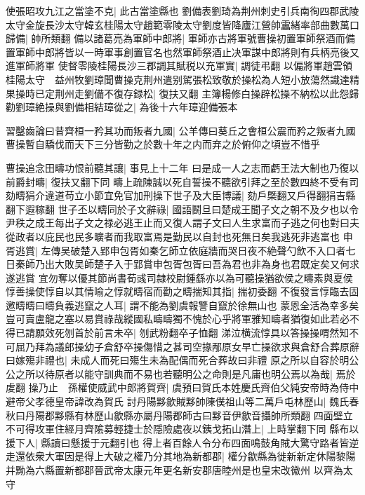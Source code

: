 使張昭攻九江之當塗不克|{
	此古當塗縣也}
劉備表劉琦為荆州刺史引兵南徇四郡武陵太守金旋長沙太守韓玄桂陽太守趙範零陵太守劉度皆降廬江營帥靁緒率部曲數萬口歸備|{
	帥所類翻}
備以諸葛亮為軍師中郎將|{
	軍師亦古將軍號曹操初置軍師祭酒而備置軍師中郎將皆以一時軍事創置官名也然軍師祭酒止决軍謀中郎將則有兵柄亮後又進軍師將軍}
使督零陵桂陽長沙三郡調其賦税以充軍實|{
	調徒弔翻}
以偏將軍趙雲領桂陽太守　益州牧劉璋聞曹操克荆州遣别駕張松致敬於操松為人短小放蕩然識達精果操時已定荆州走劉備不復存録松|{
	復扶又翻}
主簿楊修白操辟松操不納松以此怨歸勸劉璋絶操與劉備相結璋從之|{
	為後十六年璋迎備張本}


習鑿齒論曰昔齊桓一矜其功而叛者九國|{
	公羊傳曰葵丘之會桓公震而矜之叛者九國}
曹操暫自驕伐而天下三分皆勤之於數十年之内而弃之於俯仰之頃豈不惜乎

曹操追念田疇功恨前聽其讓|{
	事見上十二年}
曰是成一人之志而虧王法大制也乃復以前爵封疇|{
	復扶又翻下同}
疇上疏陳誠以死自誓操不聽欲引拜之至於數四終不受有司劾疇狷介違道苟立小節宜免官加刑操下世子及大臣博議|{
	劾戶槩翻又戶得翻狷吉縣翻下遐稼翻}
世子丕以疇同於子文辭祿|{
	國語鬭旦曰楚成王聞子文之朝不及夕也以令尹秩之成王每出子文之禄必逃王止而又復人謂子文曰人生求富而子逃之何也對曰夫從政者以庇民也民多曠者而我取富焉是勤民以自封也死無日矣我逃死非逃富也}
申胥逃賞|{
	左傳吴破楚入郢申包胥如秦乞師立依庭牆而哭日夜不絶聲勺飲不入口者七日秦師乃出大敗吴師楚子入于郢賞申包胥包胥曰吾為君也非為身也君既定矣又何求遂逃賞}
宜勿奪以優其節尚書荀彧司隸校尉鍾繇亦以為可聽操猶欲侯之疇素與夏侯惇善操使惇自以其情喻之惇就疇宿而勸之疇揣知其指|{
	揣初委翻}
不復發言惇臨去固邀疇疇曰疇負義逃竄之人耳|{
	謂不能為劉虞報讐自竄於徐無山也}
蒙恩全活為幸多矣豈可賣盧龍之塞以易賞祿哉縱國私疇疇獨不愧於心乎將軍雅知疇者猶復如此若必不得已請願效死刎首於前言未卒|{
	刎武粉翻卒子恤翻}
涕泣横流惇具以答操操喟然知不可屈乃拜為議郎操幼子倉舒卒操傷惜之甚司空掾邴原女早亡操欲求與倉舒合葬原辭曰嫁殤非禮也|{
	未成人而死曰殤生未為配偶而死合葬故曰非禮}
原之所以自容於明公公之所以待原者以能守訓典而不易也若聽明公之命則是凡庸也明公焉以為哉|{
	焉於䖍翻}
操乃止　孫權使威武中郎將賀齊|{
	虞預曰賀氏本姓慶氏齊伯父純安帝時為侍中避帝父孝德皇帝諱改為賀氏}
討丹陽黟歙賊黟帥陳僕祖山等二萬戶屯林歷山|{
	魏氏春秋曰丹陽郡黟縣有林歷山歙縣亦屬丹陽郡師古曰黟音伊歙音攝帥所類翻}
四面壁立不可得攻軍住經月齊隂募輕捷士於隱險處夜以銕戈拓山潛上|{
	上時掌翻下同}
縣布以援下人|{
	縣讀曰懸援于元翻引也}
得上者百餘人令分布四面鳴鼓角賊大驚守路者皆逆走還依衆大軍因是得上大破之權乃分其地為新都郡|{
	權分歙縣為徙新新定休陽黎陽并黝為六縣置新都郡晉武帝太康元年更名新安郡唐睦州是也皇宋改徽州}
以齊為太守

